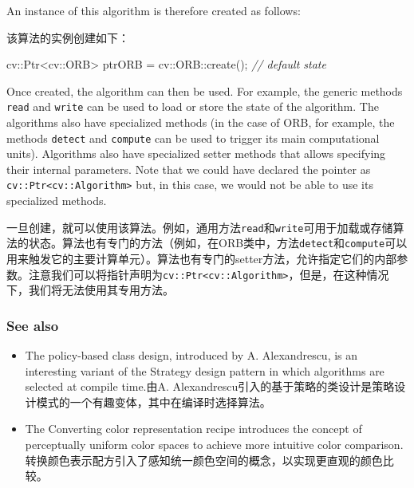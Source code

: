 \documentclass[]{article}
\newenvironment{Shaded}{}{}
\newcommand{\CommentTok}[1]{\textcolor[rgb]{0.38,0.63,0.69}{\textit{#1}}}
\newcommand{\NormalTok}[1]{#1}
\begin{document}
An instance of this algorithm is therefore created as follows:

该算法的实例创建如下：

\begin{Shaded}
\begin{Highlighting}[]
\NormalTok{cv::Ptr<cv::ORB> ptrORB = cv::ORB::create(); }\CommentTok{// default state}
\end{Highlighting}
\end{Shaded}

Once created, the algorithm can then be used. For example, the generic
methods \texttt{read} and \texttt{write} can be used to load or store
the state of the algorithm. The algorithms also have specialized methods
(in the case of ORB, for example, the methods \texttt{detect} and
\texttt{compute} can be used to trigger its main computational units).
Algorithms also have specialized setter methods that allows specifying
their internal parameters. Note that we could have declared the pointer
as \texttt{cv::Ptr\textless{}cv::Algorithm\textgreater{}} but, in this
case, we would not be able to use its specialized methods.

一旦创建，就可以使用该算法。例如，通用方法\texttt{read}和\texttt{write}可用于加载或存储算法的状态。算法也有专门的方法（例如，在ORB类中，方法\texttt{detect}和\texttt{compute}可以用来触发它的主要计算单元）。算法也有专门的setter方法，允许指定它们的内部参数。注意我们可以将指针声明为\texttt{cv::Ptr\textless{}cv::Algorithm\textgreater{}}，但是，在这种情况下，我们将无法使用其专用方法。

\hypertarget{header-n1271}{%
\subsubsection{See also}\label{header-n1271}}

\begin{itemize}
\item
  The policy-based class design, introduced by A. Alexandrescu, is an
  interesting variant of the Strategy design pattern in which algorithms
  are selected at compile time.由A.
  Alexandrescu引入的基于策略的类设计是策略设计模式的一个有趣变体，其中在编译时选择算法。
\item
  The Converting color representation recipe introduces the concept of
  perceptually uniform color spaces to achieve more intuitive color
  comparison.转换颜色表示配方引入了感知统一颜色空间的概念，以实现更直观的颜色比较。
\end{itemize}
\end{document}
